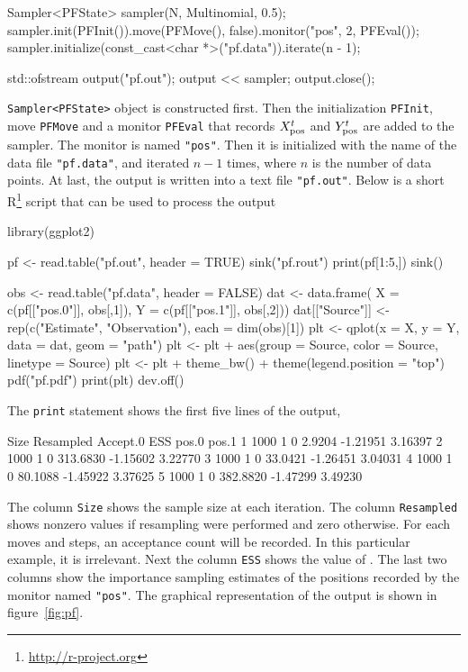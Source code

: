 \begin{cppcode}
    Sampler<PFState> sampler(N, Multinomial, 0.5);
    sampler.init(PFInit()).move(PFMove(), false).monitor("pos", 2, PFEval());
    sampler.initialize(const_cast<char *>("pf.data")).iterate(n - 1);

    std::ofstream output("pf.out");
    output << sampler;
    output.close();
\end{cppcode}
\verb|Sampler<PFState>| object is constructed first. Then the initialization
\verb|PFInit|, move \verb|PFMove| and a monitor \verb|PFEval| that records
$X_{\mathrm{pos}}^t$ and $Y_{\mathrm{pos}}^t$ are added to the sampler. The monitor is named
\verb|"pos"|. Then it is initialized with the name of the data file
\verb|"pf.data"|, and iterated $n - 1$ times, where $n$ is the number of data
points. At last, the output is written into a text file \verb|"pf.out"|. Below
is a short R\footnote{\url{http://r-project.org}} script that can be used to
process the output
\begin{rcode}
  library(ggplot2)

  pf <- read.table("pf.out", header = TRUE)
  sink("pf.rout")
  print(pf[1:5,])
  sink()

  obs <- read.table("pf.data", header = FALSE)
  dat <- data.frame(
  X = c(pf[["pos.0"]], obs[,1]),
  Y = c(pf[["pos.1"]], obs[,2]))
  dat[["Source"]] <- rep(c("Estimate", "Observation"), each = dim(obs)[1])
  plt <- qplot(x = X, y = Y, data = dat, geom = "path")
  plt <- plt + aes(group = Source, color = Source, linetype = Source)
  plt <- plt + theme_bw() + theme(legend.position = "top")
  pdf("pf.pdf")
  print(plt)
  dev.off()
\end{rcode}
The \verb|print| statement shows the first five lines of the output,
\begin{textcode}
    Size Resampled Accept.0      ESS    pos.0   pos.1
  1 1000         1        0   2.9204 -1.21951 3.16397
  2 1000         1        0 313.6830 -1.15602 3.22770
  3 1000         1        0  33.0421 -1.26451 3.04031
  4 1000         1        0  80.1088 -1.45922 3.37625
  5 1000         1        0 382.8820 -1.47299 3.49230
\end{textcode}
The column \verb|Size| shows the sample size at each iteration. The column
\verb|Resampled| shows nonzero values if resampling were performed and zero
otherwise. For each moves and \mcmc steps, an acceptance count will be
recorded. In this particular example, it is irrelevant. Next the column
\verb|ESS| shows the value of \ess. The last two columns show the importance
sampling estimates of the positions recorded by the monitor named \verb|"pos"|.
The graphical representation of the output is shown in figure~\ref{fig:pf}.

